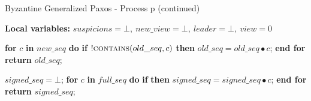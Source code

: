 \begin{algorithm}
	\caption{Byzantine Generalized Paxos - Process p (continued)}
	\label{BFT-Proc}
	\textbf{Local variables:} $suspicions = \bot,\ new\_view = \bot,\ leader = \bot,\ view = 0$	
	
	\begin{algorithmic}[1]

		\State \textbf{for} $c$ \textbf{in} $new\_seq$ \textbf{do} 
		\State \hspace{\algorithmicindent} \textbf{if} $!\Call{contains}{old\_seq,c}$ \textbf{then}
		\State \hspace{\algorithmicindent}\hspace{\algorithmicindent}\hspace{\algorithmicindent} $old\_seq =  old\_seq \bullet c$;
		\State \textbf{end for}
		\State \textbf{return} $old\_seq$;
		\EndFunction
		
		\State
		\State $signed\_seq = \bot$;
		\State \textbf{for} $c$ \textbf{in} $full\_seq$ \textbf{do}
		\State \hspace{\algorithmicindent} \textbf{if}  \textbf{then}
		\State \hspace{\algorithmicindent}\hspace{\algorithmicindent} $signed\_seq = signed\_seq \bullet c$;
		\State \textbf{end for}
		\State \textbf{return} $signed\_seq$;
		\EndFunction
	\end{algorithmic}
\end{algorithm}

